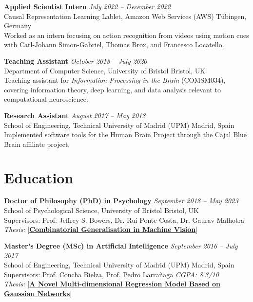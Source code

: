 \documentclass[10pt,a4paper]{article}
\newcommand{\linkbadge}[2]{%
  \textcolor{tagcolor}{[}\href{#2}{\textbf{#1}}\textcolor{tagcolor}{]}%
}
\begin{document}
\vspace{0.45em}
\textbf{Applied Scientist Intern} \hfill \textit{July 2022 -- December 2022} \\
Causal Representation Learning Lablet, Amazon Web Services (AWS) \hfill T\"ubingen, Germany \\
Worked as an intern focusing on action recognition from videos using motion cues with Carl-Johann Simon-Gabriel, Thomas Brox, and Francesco Locatello.

\vspace{0.45em}
\textbf{Teaching Assistant} \hfill \textit{October 2018 -- July 2020} \\
Department of Computer Science, University of Bristol \hfill Bristol, UK \\
Teaching assistant for \textit{Information Processing in the Brain} (COMSM034), covering information theory, deep learning, and data analysis relevant to computational neuroscience.

\vspace{0.45em}
\textbf{Research Assistant} \hfill \textit{August 2017 -- May 2018} \\
School of Engineering, Technical University of Madrid (UPM) \hfill Madrid, Spain \\
Implemented software tools for the Human Brain Project through the Cajal Blue Brain affiliate project.

\section*{Education}

\textbf{Doctor of Philosophy (PhD) in Psychology} \hfill \textit{September 2018 -- May 2023} \\
School of Psychological Science, University of Bristol \hfill Bristol, UK \\
Supervisors: Prof. Jeffrey S. Bowers, Dr. Rui Ponte Costa, Dr. Gaurav Malhotra \\
\textit{Thesis:} \linkbadge{Combinatorial Generalisation in Machine Vision}{https://research-information.bris.ac.uk/en/studentTheses/combinatorial-generalisation-in-machine-vision/}

\vspace{0.45em}
\textbf{Master's Degree (MSc) in Artificial Intelligence} \hfill \textit{September 2016 -- July 2017} \\
School of Engineering, Technical University of Madrid (UPM) \hfill Madrid, Spain \\
Supervisors: Prof. Concha Bielza, Prof. Pedro Larrañaga \hfill \textit{CGPA: 8.8/10} \\
\textit{Thesis:} \linkbadge{A Novel Multi-dimensional Regression Model Based on Gaussian Networks}{https://cig.fi.upm.es/wp-content/uploads/2024/01/TFM_MILTON_LLERA_MONTERO.pdf}
\end{document}
